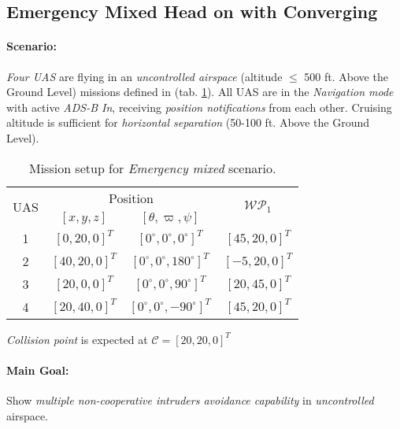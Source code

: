 \subsection{Emergency Mixed Head on with Converging}\label{s:testEmergencyMixed}

    \noindent\paragraph{Scenario:} \emph{Four UAS} are flying in an \emph{uncontrolled airspace} (altitude $\le$ 500 ft. Above the Ground Level) missions defined in (tab. \ref{tab:missionSetupEmergencyMixedScenario}). All UAS are in the \emph{Navigation mode} with active \emph{ADS-B In}, receiving \emph{position notifications} from each other. Cruising altitude is sufficient for \emph{horizontal separation} (50-100 ft. Above the Ground Level).
    
    
    \begin{table}[H]
        \centering
        \begin{tabular}{c||c|c||c}
            \multirow{2}{*}{UAS} &\multicolumn{2}{c||}{Position} & \multirow{2}{*}{$\mathscr{WP}_1$} \\\cline{2-3}
              & $[x,y,z]$           & $[\theta,\varpi,\psi]$           & \\\hline\hline
            1 & $[0,20,0]^T $       & $[0^\circ,0^\circ,0^\circ]^T$    & $[45,20,0]^T$\\\hline 
            2 & $[40,20,0]^T $       & $[0^\circ,0^\circ,180^\circ]^T$    & $[-5,20,0]^T$\\\hline 
            3 & $[20,0,0]^T $       & $[0^\circ,0^\circ,90^\circ]^T$    & $[20,45,0]^T$\\\hline 
            4 & $[20,40,0]^T $       & $[0^\circ,0^\circ,-90^\circ]^T$  & $[45,20,0]^T$\\ 
        \end{tabular}
        \caption{Mission setup for \emph{Emergency mixed} scenario.}
        \label{tab:missionSetupEmergencyMixedScenario}
    \end{table}
    
    \begin{note}
        \emph{Collision point} is expected at $\mathscr{C}=[20,20,0]^T$
    \end{note}
    
    \noindent \paragraph{Main Goal:} Show \emph{multiple non-cooperative intruders avoidance capability} in \emph{uncontrolled} airspace.
    
